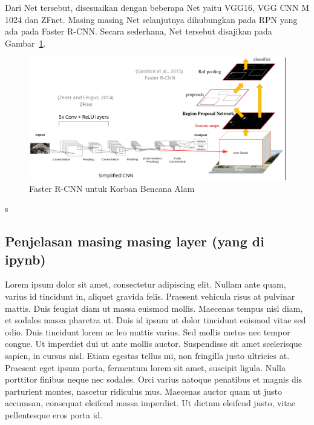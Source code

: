 Dari Net tersebut, disesuaikan dengan beberapa Net yaitu VGG16, VGG CNN M 1024 dan ZFnet. Masing masing Net selanjutnya dihubungkan pada RPN yang ada pada Faster R-CNN. Secara sederhana, Net tersebut disajikan pada Gambar~\ref{fig:struktur_rcnn}.

\begin{figure}[ht]
  \centering
  \includegraphics[width=\textwidth]{struktur_rcnn}
  \caption{Faster R-CNN untuk Korban Bencana Alam}
  \label{fig:struktur_rcnn}
\end{figure}s

\subsection{ Penjelasan masing masing layer (yang di ipynb)}
Lorem ipsum dolor sit amet, consectetur adipiscing elit. Nullam ante quam, varius id tincidunt in, aliquet gravida felis. Praesent vehicula risus at pulvinar mattis. Duis feugiat diam ut massa euismod mollis. Maecenas tempus nisl diam, et sodales massa pharetra ut. Duis id ipsum ut dolor tincidunt euismod vitae sed odio. Duis tincidunt lorem ac leo mattis varius. Sed mollis metus nec tempor congue. Ut imperdiet dui ut ante mollis auctor. Suspendisse sit amet scelerisque sapien, in cursus nisl. Etiam egestas tellus mi, non fringilla justo ultricies at. Praesent eget ipsum porta, fermentum lorem sit amet, suscipit ligula. Nulla porttitor finibus neque nec sodales. Orci varius natoque penatibus et magnis dis parturient montes, nascetur ridiculus mus. Maecenas auctor quam ut justo accumsan, consequat eleifend massa imperdiet. Ut dictum eleifend justo, vitae pellentesque eros porta id.

